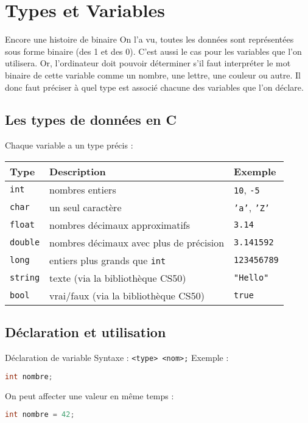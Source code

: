\section{Types et Variables}
\begin{UPSTIinfor}{Encore une histoire de binaire}
	On l'a vu, toutes les données sont représentées sous forme binaire (des 1 et des 0). C'est aussi le cas pour les variables que l'on utilisera.
	Or, l'ordinateur doit pouvoir déterminer s'il faut interpréter le mot binaire de cette variable comme un nombre, une lettre, une couleur ou autre.
	Il donc faut préciser à quel type est associé chacune des variables que l'on déclare.
\end{UPSTIinfor}

\subsection{Les types de données en C}

Chaque variable a un type précis :
\begin{center}
	\begin{tabular}{|l|l|l|}
		\hline
		Type            & Description                             & Exemple                    \\
		\hline
		\texttt{int}    & nombres entiers                         & \texttt{10}, \texttt{-5}   \\
		\texttt{char}   & un seul caractère                       & \texttt{'a'}, \texttt{'Z'} \\
		\texttt{float}  & nombres décimaux approximatifs          & \texttt{3.14}              \\
		\texttt{double} & nombres décimaux avec plus de précision & \texttt{3.141592}          \\
		\texttt{long}   & entiers plus grands que \texttt{int}    & \texttt{123456789}         \\
		\texttt{string} & texte (via la bibliothèque CS50)        & \texttt{"Hello"}           \\
		\texttt{bool}   & vrai/faux (via la bibliothèque CS50)    & \texttt{true}              \\
		\hline
	\end{tabular}
\end{center}
\subsection{Déclaration et utilisation}

\begin{UPSTIinfor}{Déclaration de variable}
	Syntaxe : \texttt{<type> <nom>;}
	Exemple :
	\begin{lstlisting}[language=c]
int nombre;
\end{lstlisting}
	On peut affecter une valeur en même temps :
	\begin{lstlisting}[language=c]
int nombre = 42;
\end{lstlisting}
\end{UPSTIinfor}

